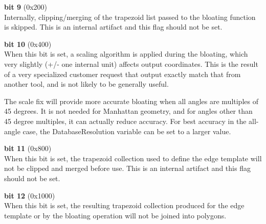 \begin{description}
\item{\bf bit 9} (0x200)\\
Internally, clipping/merging of the trapezoid list passed to the
bloating function is skipped.  This is an internal artifact and this
flag should not be set.

\item{\bf bit 10} (0x400)\\
When this bit is set, a scaling algorithm is applied during the
bloating, which very slightly (+/- one internal unit) affects output
coordinates.  This is the result of a very specialized customer
request that output exactly match that from another tool, and is not
likely to be generally useful.

The scale fix will provide more accurate bloating when all angles are
multiples of 45 degrees.  It is not needed for Manhattan geometry, and
for angles other than 45 degree multiples, it can actually reduce
accuracy.  For best accuracy in the all-angle case, the {\et
DatabaseResolution} variable can be set to a larger value.

\item{\bf bit 11} (0x800)\\
When this bit is set, the trapezoid collection used to define the edge
template will not be clipped and merged before use.  This is an
internal artifact and this flag should not be set.

\item{\bf bit 12} (0x1000)\\
When this bit is set, the resulting trapezoid collection produced for
the edge template or by the bloating operation will not be joined into
polygons.

\end{description}

